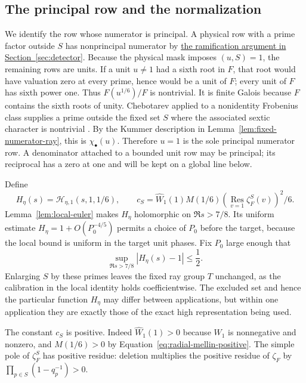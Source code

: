\documentclass[11pt,a4paper]{article}
\numberwithin{equation}{section}
\numberwithin{figure}{section}
\theoremstyle{definition}
\theoremstyle{remark}
\begin{document}
\subsection{The principal row and the normalization}

We identify the row whose numerator is principal.  A physical row
with a prime factor outside $S$ has nonprincipal numerator by
\hyperref[par:physical-row-ramification]{the ramification argument in
Section~\ref*{sec:detector}}.  Because the physical mask imposes $(u,S)=1$,
the remaining rows are units.  If a unit $u\ne1$ had a sixth root in $F$,
that root would have valuation zero at every prime, hence would be a unit
of $F$; every unit of $F$ has sixth power one.  Thus
$F(u^{1/6})/F$ is nontrivial.  It is finite Galois because $F$ contains
the sixth roots of unity.  Chebotarev applied to a nonidentity Frobenius
class supplies a prime outside the fixed set $S$ where the associated
sextic character is nontrivial \cite[Theorem 1.1]{TZ}.  By the Kummer
description in Lemma~\ref{lem:fixed-numerator-ray}, this is
$\chi_\bullet(u)$.  Therefore $u=1$ is the sole principal numerator row.
A denominator attached to a bounded unit row may be principal; its
reciprocal has a zero at one and will be kept on a global line below.

Define
\begin{equation}
 H_\eta(s)=\mathcal H_{\eta,1}(s,1,1/6),\qquad
 c_S=\widehat W_1(1)M(1/6)
       \left(\operatorname*{Res}_{v=1}\zeta_F^S(v)\right)^2/6.
 \label{eq:shared-principal-data}
\end{equation}
Lemma~\ref{lem:local-euler} makes $H_\eta$ holomorphic on $\Re s>7/8$.
Its uniform estimate $H_\eta=1+O(P_0^{-4/5})$ permits a choice of $P_0$
before the target, because the local bound is uniform in the target unit
phases.  Fix $P_0$ large enough that
\begin{equation}
 \sup_{\Re s>7/8}|H_\eta(s)-1|\le\frac12.
 \label{eq:shared-principal-nonvanishing}
\end{equation}
Enlarging $S$ by these primes leaves the fixed ray group $T$ unchanged,
as the calibration in the local identity holds coefficientwise.  The
excluded set and hence the particular function $H_\eta$ may differ between
applications, but within one application they are exactly those of
the exact high representation being used.

The constant $c_S$ is positive.  Indeed $\widehat W_1(1)>0$ because
$W_1$ is nonnegative and nonzero, and $M(1/6)>0$ by
Equation~\eqref{eq:radial-mellin-positive}.  The simple pole of
$\zeta_F^S$ has positive residue: deletion multiplies the positive residue
of $\zeta_F$ by $\prod_{p\in S}(1-q_p^{-1})>0$.
\end{document}

